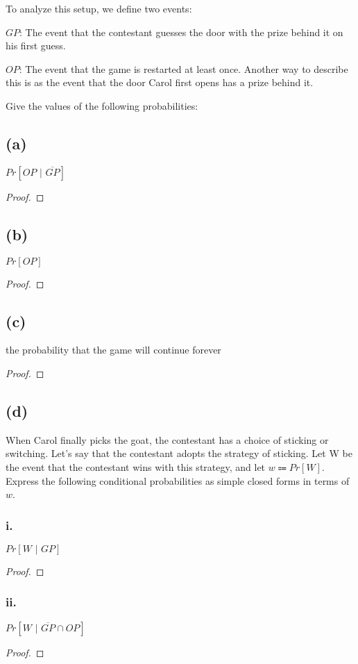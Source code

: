 \documentclass[14pt]{extarticle}
\begin{document}
To analyze this setup, we define two events:

$GP$: The event that the contestant guesses the door with the prize behind it on his first guess.

$OP$: The event that the game is restarted at least once. Another way to describe this is as the event that the door Carol first opens has a prize behind it.

Give the values of the following probabilities:
\subsection{(a)}
$Pr[OP \,\,|\,\, \overline{GP}]$
\begin{proof}
\end{proof}

\subsection{(b)}
$Pr[OP]$
\begin{proof}
\end{proof}

\subsection{(c)}
the probability that the game will continue forever
\begin{proof}
\end{proof}

\subsection{(d)}
When Carol finally picks the goat, the contestant has a choice of sticking or switching. Let’s say that the contestant adopts the strategy of sticking. Let W be the event that the contestant wins with this strategy, and let $w \Coloneqq Pr[W]$. Express the following conditional probabilities as simple closed forms in terms of $w$.
\subsubsection{i.}
$Pr[W \,\,|\,\, GP]$
\begin{proof}
\end{proof}

\subsubsection{ii.}
$Pr[W \,\,|\,\, \overline{GP}\cap OP]$
\begin{proof}
\end{proof}
\end{document}

